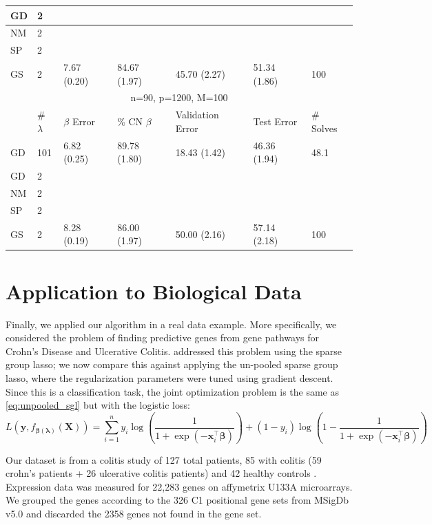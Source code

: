 \documentclass[12pt]{article}
\begin{document}
\begin{table}
\begin{tabular}{| l | l | l | l | l | l | l |}
\hline
GD & 2 & & & & & \\
\hline
NM & 2 & & & & & \\
\hline
SP & 2 &  & & & & \\
\hline
GS & 2 & 7.67 (0.20) & 84.67 (1.97) & 45.70 (2.27) & 51.34 (1.86) & 100 \\
\hline
\multicolumn{7}{|c|}{n=90, p=1200, M=100}\\
\hline
& \# $\lambda$ & $\beta$ Error & \% CN $\beta$ & Validation Error & Test Error & \# Solves \\
\hline
GD & 101 & 6.82 (0.25) & 89.78 (1.80) & 18.43 (1.42) & 46.36 (1.94) & 48.1 \\
\hline
GD & 2 & & & & & \\
\hline
NM & 2 & & & & & \\
\hline
SP & 2 &  & & & & \\
\hline
GS & 2 & 8.28 (0.19) & 86.00 (1.97) & 50.00 (2.16) & 57.14 (2.18) & 100 \\
\hline
\end{tabular}
\end{table}


\section{Application to Biological Data}\label{realDataResults}
Finally, we applied our algorithm in a real data example. More specifically, we considered the problem of finding predictive genes from gene pathways for Crohn's Disease and Ulcerative Colitis. \citet{simon2013sparse} addressed this problem using the sparse group lasso; we now compare this against applying the un-pooled sparse group lasso, where the regularization parameters were tuned using gradient descent. Since this is a classification task, the joint optimization problem is the same as \eqref{eq:unpooled_sgl} but with the logistic loss:
\begin{equation}
L\left ( \boldsymbol{y}, f_{\boldsymbol \beta(\boldsymbol\lambda)}(\boldsymbol{X}) \right ) = \sum_{i=1}^{n} y_{i} \log \left ( \frac{1}{1+\exp(-\boldsymbol x_{i}^\top \boldsymbol \beta)} \right ) + (1- y_i)\log \left (1 - \frac{1}{1+\exp(-\boldsymbol x_i^\top \boldsymbol \beta)} \right)
\end{equation}


Our dataset is from a colitis study of 127 total patients, 85 with colitis (59 crohn's patients + 26 ulcerative colitis patients) and 42 healthy controls \citep{burczynski2006molecular}. Expression data was measured for 22,283 genes on affymetrix U133A microarrays. We grouped the genes according to the 326 C1 positional gene sets from MSigDb v5.0 \citep{subramanian2005gene} and discarded the 2358 genes not found in the gene set.
\end{document}
